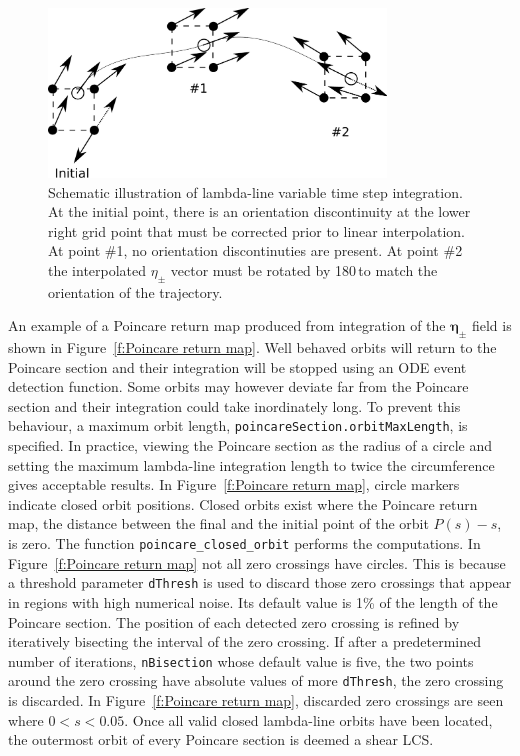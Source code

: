 \documentclass{article}
\begin{document}
\begin{figure}
\begin{center}
\includegraphics[width=0.8\textwidth]{graphics/variable_step_integration}
\end{center}
\caption{Schematic illustration of lambda-line variable time step integration. At the initial point, there is an orientation discontinuity at the lower right grid point that must be corrected prior to linear interpolation. At point \#1, no orientation discontinuties are present. At point \#2 the interpolated $\eta_\pm$ vector must be rotated by 180\degree\,to match the orientation of the trajectory.}
\label{f:variable step integration}
\end{figure}

An example of a Poincare return map produced from integration of the $\boldsymbol \eta_\pm$ field is shown in Figure~\ref{f:Poincare return map}. Well behaved orbits will return to the Poincare section and their integration will be stopped using an ODE event detection function. Some orbits may however deviate far from the Poincare section and their integration could take inordinately long. To prevent this behaviour, a maximum orbit length, \lstinline!poincareSection.orbitMaxLength!, is specified. In practice, viewing the Poincare section as the radius of a circle and setting the maximum lambda-line integration length to twice the circumference gives acceptable results. In Figure~\ref{f:Poincare return map}, circle markers indicate closed orbit positions. Closed orbits exist where the Poincare return map, the distance between the final and the initial point of the orbit $P(s)-s$, is zero. The function \lstinline!poincare_closed_orbit! performs the computations. In Figure~\ref{f:Poincare return map} not all zero crossings have circles. This is because a threshold parameter \lstinline!dThresh! is used to discard those zero crossings that appear in regions with high numerical noise. Its default value is 1\% of the length of the Poincare section. The position of each detected zero crossing is refined by iteratively bisecting the interval of the zero crossing. If after a predetermined number of iterations, \lstinline!nBisection! whose default value is five, the two points around the zero crossing have absolute values of more \lstinline!dThresh!, the zero crossing is discarded. In Figure~\ref{f:Poincare return map}, discarded zero crossings are seen where $0 < s < 0.05$. Once all valid closed lambda-line orbits have been located, the outermost orbit of every Poincare section is deemed a shear LCS.
\end{document}
